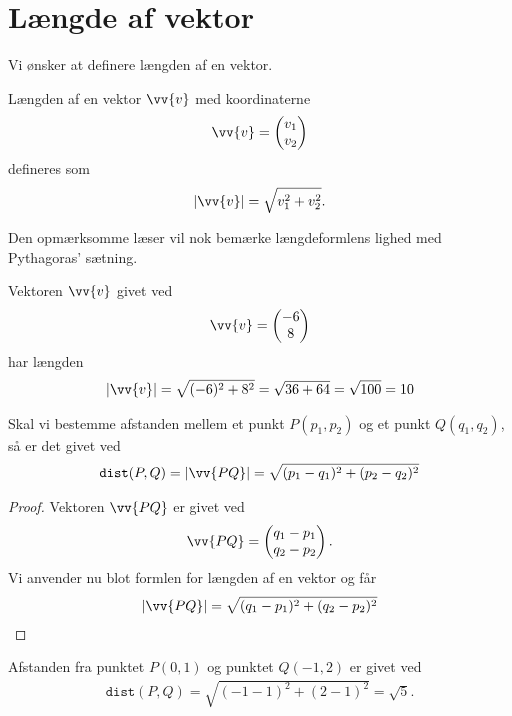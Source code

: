 \newpage
\section*{Længde af vektor}

Vi ønsker at definere længden af en vektor. 
\begin{defn}
	Længden af en vektor $\vv{v}$ med koordinaterne
	\begin{align*}
		\vv{v} = 
		\begin{pmatrix}
			v_1 \\ v_2
		\end{pmatrix}
	\end{align*}
	defineres som
	\begin{align*}
		|\vv{v}| = \sqrt{v_1^2 + v_2^2}.
	\end{align*}
\end{defn}
Den opmærksomme læser vil nok bemærke længdeformlens lighed med Pythagoras' sætning. 

\begin{exa}
	Vektoren $\vv{v}$ givet ved
	\begin{align*}
		\vv{v} = 
		\begin{pmatrix}
			-6 \\ 8
		\end{pmatrix}
	\end{align*}
	har længden 
	\begin{align*}
		|\vv{v}| = \sqrt{(-6)^2+8^2} = \sqrt{36+64} = \sqrt{100} = 10
	\end{align*}
\end{exa}

\begin{setn}
Skal vi bestemme afstanden mellem et punkt $P(p_1,p_2)$ og et punkt $Q(q_1,q_2)$, så er det givet ved
\begin{align*}
\texttt{dist}(P,Q) = |\vv{PQ}| = \sqrt{(p_1-q_1)^2+(p_2-q_2)^2}
\end{align*}
\end{setn}
\begin{proof}
Vektoren $\vv{PQ}$ er givet ved
\begin{align*}
\vv{PQ}=\begin{pmatrix}
q_1-p_1\\q_2-p_2
\end{pmatrix}.
\end{align*}
Vi anvender nu blot formlen for længden af en vektor og får
\begin{align*}
|\vv{PQ}| = \sqrt{(q_1-p_1)^2+(q_2-p_2)^2}
\end{align*}
\end{proof}
\begin{exa}
Afstanden fra punktet $P(0,1)$ og punktet $Q(-1,2)$ er givet ved
\begin{align*}
\texttt{dist}(P,Q) = \sqrt{(-1-1)^2+(2-1)^2} = \sqrt{5}.
\end{align*}
\end{exa}

